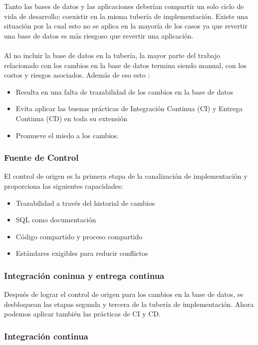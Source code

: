 \documentclass[preprint,12pt]{elsarticle}
\begin{document}
Tanto las bases de datos y las aplicaciones deberían compartir un solo ciclo de vida de desarrollo; coexistir en la misma tubería de implementación. Existe una situación por la cual esto no se aplica en la mayoría de los casos ya que revertir una base de datos es más riesgoso que revertir una aplicación.\\ \\ 
Al no incluir la base de datos en la tubería, la mayor parte del trabajo relacionado con los cambios en la base de datos termina siendo manual, con los costos y riesgos asociados. Además de eso esto :
\begin{itemize}

\item  Resulta en una falta de trazabilidad de los cambios en la base de datos
\item Evita aplicar las buenas prácticas de Integración Continua (CI) y Entrega Continua (CD) en toda su extensión
\item Promueve el miedo a los cambios.  \cite{CI/CD}

\end{itemize}
\subsubsection{\textbf{Fuente de Control}}

El control de origen es la primera etapa de la canalización de implementación y proporciona las siguientes capacidades:
\begin{itemize}

\item Trazabilidad a través del historial de cambios
\item SQL como documentación
\item Código compartido y proceso compartido
\item Estándares exigibles para reducir conflictos

\end{itemize}

\subsubsection{\textbf{Integración coninua y entrega continua}}
Después de lograr el control de origen para los cambios en la base de datos, se desbloquean las etapas segunda y tercera de la tubería de implementación. Ahora podemos aplicar también las prácticas de CI y CD.


\subsubsection{\textbf{ Integración continua}}
\end{document}
